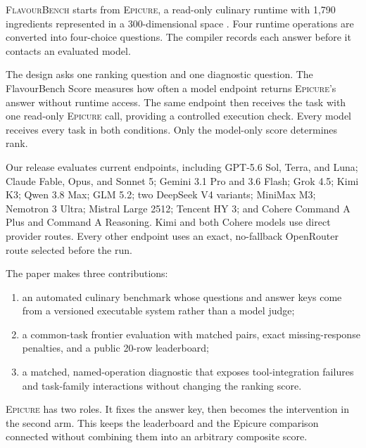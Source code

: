 \documentclass[10pt,twocolumn]{article}
\newcommand{\system}{\textsc{FlavourBench}}
\newcommand{\epicure}{\textsc{Epicure}}
\begin{document}
\system{} starts from \epicure{}, a read-only culinary runtime with 1,790 ingredients represented
in a 300-dimensional space \cite{radzikowski2026structure,radzikowski2026geometry}. Four runtime
operations are converted into four-choice questions. The compiler records each answer before it
contacts an evaluated model.

The design asks one ranking question and one diagnostic question. The FlavourBench Score measures
how often a model endpoint returns \epicure{}'s answer without runtime access. The same endpoint
then receives the task with one read-only \epicure{} call, providing a controlled execution check.
Every model receives every task in both conditions. Only the model-only score determines rank.

Our release evaluates \FBModels{} current endpoints, including GPT-5.6 Sol, Terra, and Luna;
Claude Fable, Opus, and Sonnet 5; Gemini 3.1 Pro and 3.6 Flash; Grok 4.5; Kimi K3; Qwen 3.8 Max;
GLM 5.2; two DeepSeek V4 variants; MiniMax M3; Nemotron 3 Ultra; Mistral Large 2512; Tencent HY 3;
and Cohere Command A Plus and Command A Reasoning. Kimi and both Cohere models use direct provider
routes. Every other endpoint uses an exact, no-fallback OpenRouter route selected before the run.

The paper makes three contributions:

\begin{enumerate}[label=\arabic*.]
  \item an automated culinary benchmark whose questions and answer keys come from a versioned
  executable system rather than a model judge;
  \item a common-task frontier evaluation with \FBPairs{} matched pairs, exact missing-response
  penalties, and a public 20-row leaderboard;
  \item a matched, named-operation diagnostic that exposes tool-integration failures and
  task-family interactions without changing the ranking score.
\end{enumerate}

\epicure{} has two roles. It fixes the answer key, then becomes the intervention in the second arm.
This keeps the leaderboard and the Epicure comparison connected without combining them into an
arbitrary composite score.
\end{document}
